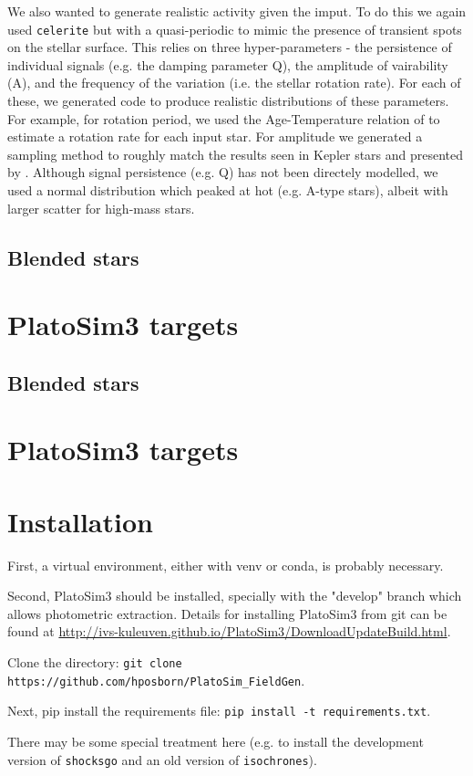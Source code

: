 \documentclass{article}
\begin{document}
We also wanted to generate realistic activity given the imput. To do this we again used \texttt{celerite} but with a quasi-periodic to mimic the presence of transient spots on the stellar surface. This relies on three hyper-parameters - the persistence of individual signals (e.g. the damping parameter Q), the amplitude of vairability (A), and the frequency of the variation (i.e. the stellar rotation rate).
For each of these, we generated code to produce realistic distributions of these parameters. For example, for rotation period, we used the Age-Temperature relation of \citet{angus} to estimate a rotation rate for each input star.
For amplitude we generated a sampling method to roughly match the results seen in Kepler stars and presented by \citet{mcquillan2014rotation}. 
Although signal persistence (e.g. Q) has not been directely modelled, we used a normal distribution which peaked at  hot (e.g. A-type stars), albeit with larger scatter for high-mass stars.

\subsection{Blended stars}

\section{PlatoSim3 targets}


\subsection{Blended stars}

\section{PlatoSim3 targets}

\section{Installation}
First, a virtual environment, either with venv or conda, is probably necessary.

Second, PlatoSim3 should be installed, specially with the "develop" branch which allows photometric extraction. Details for installing PlatoSim3 from git can be found at \url{http://ivs-kuleuven.github.io/PlatoSim3/DownloadUpdateBuild.html}.

Clone the directory: \texttt{git clone https://github.com/hposborn/PlatoSim\_FieldGen}.

Next, pip install the requirements file: \texttt{pip install -t requirements.txt}.

There may be some special treatment here (e.g. to install the development version of \texttt{shocksgo} and an old version of \texttt{isochrones}).



\end{document}
